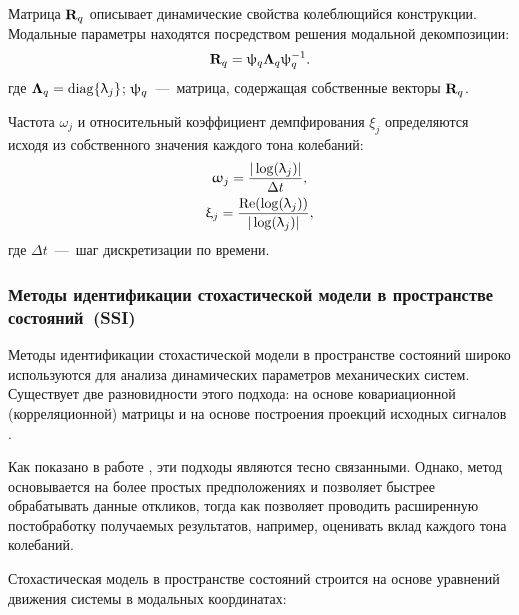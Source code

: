 Матрица $ \mathbf{R}_q $ описывает динамические свойства колеблющийся конструкции. Модальные параметры находятся посредством решения модальной декомпозиции:
\begin{equation}
	\mathbf{R}_q = \uppsi_q \mathbf{\Lambda}_q \uppsi_q^{-1}.
\end{equation}
где $ \mathbf{\Lambda}_q = \operatorname{diag} \{ \uplambda_j \} $; $ \mathbf{\uppsi}_q $~---~матрица, содержащая собственные векторы $ \mathbf{R}_q $.

Частота $ \omega_j $ и относительный коэффициент демпфирования $ \xi_j $ определяются исходя из собственного значения каждого тона колебаний:
\begin{equation}
	\begin{gathered}
		\upomega_j = \frac{|\log(\uplambda_j)|}{\Delta t}, \\
		\upxi_j = \frac{\operatorname{Re}(\log(\uplambda_j))}{|\log(\uplambda_j)|},
	\end{gathered}
\end{equation}
где $ \Delta t $~---~шаг дискретизации по времени.

\subsubsection{Методы идентификации стохастической модели в пространстве состояний~(SSI)}

Методы идентификации стохастической модели в пространстве состояний широко используются для анализа динамических параметров механических систем. Существует две разновидности этого подхода: на основе ковариационной (корреляционной) матрицы  и на основе построения проекций исходных сигналов  \cite{lib:oma:Rainieri}. 

Как показано в работе \cite{lib:oma:Peeters}, эти подходы являются тесно связанными. Однако, метод  основывается на более простых предположениях и позволяет быстрее обрабатывать данные откликов, тогда как  позволяет проводить расширенную постобработку получаемых результатов, например, оценивать вклад каждого тона колебаний.

Стохастическая модель в пространстве состояний строится на основе уравнений движения системы в модальных координатах:

